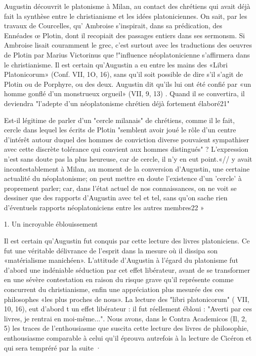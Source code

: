 Augustin découvrit le platonisme à Milan, au contact des chrétiens qui avait déjà
fait la synthèse entre le christianisme et les idées platoniciennes. On sait, par les travaux de Courcelles, qu' Ambroise s'inspirait, dans sa prédication, des Ennéades œ
Plotin, dont il recopiait des passages entiers dans ses sermonsm. Si Ambroise lisait couramment le grec, c'est surtout avec les traductions  des  oeuvres  de  Plotin par Marius Victorinus que !"influence néoplatonicienne s'affirmera dans le christianisme. Il est certain qu'Augustin a eu entre les mains des «Libri Platonicorum» (Conf. VII, 1O, 16), sans qu'il soit possible de dire s'il s'agit de Plotin ou de Porphyre, ou des deux. Augustin dit qu'ils lui ont été confié par «un homme gonflé d'un monstrueux orgueil» (VII, 9, 13) . Quand il se convertira, il deviendra "l'adepte d'un néoplatonisme chrétien déjà fortement élaboré21"

Est-il légitime de parler d'un	"cercle	milanais" de chrétiens, comme il le fait, cercle dans lequel les écrits de Plotin "semblent avoir joué le rôle d'un centre d'intérêt autour duquel des hommes de conviction diverse pouvaient sympathiser avec cette discrète tolérance qui convient aux hommes distingués" ?	L'expression n'est sans doute pas la plus heureuse, car de cercle, il n'y en eut point.«// y avait incontestablement à Milan, au moment de la conversion d'Augustin,	une certaine actualité du néoplatonisme; on peut mettre en doute l'existence d'un 'cercle' à proprement parler; car, dans l'état actuel de nos connaissances, on ne voit se dessiner que des rapports d'Augustin avec tel et tel, sans qu'on sache rien d'éventuels rapports néoplatoniciens entre les autres membres22 »

1.	Un incroyable  éblouissement

Il est certain qu'Augustin fut conquis par cette lecture des livres platoniciens. Ce fut  une  véritable  délivrance  de  l'esprit  dans la mesure où il dissipa son
«matérialisme  manichéen». L'attitude d'Augustin à l'égard du platonisme fut d'abord une indéniable séduction par cet effet libérateur, avant de se transformer en une sévère contestation en raison du risque grave qu'il représente comme concurrent du christianisme, enfin une appréciation plus mesurée des ces philosophes «les plus proches de nous».  La lecture des "libri platonicorum" ( VII, 10, 16), eut d'abord t un effet  libérateur : il fut réellement ébloui : "Averti par ces livres, je rentrai en moi-même...". Nous avons, dans le Contra Academicos (Il, 2, 5) les traces de l'enthousiasme que suscita cette lecture des livres de philosophie,  enthousiasme
comparable à celui qu'il éprouva autrefois à la lecture de Cicéron et qui sera tempréré par la suite	·

